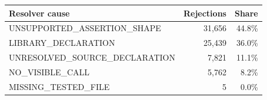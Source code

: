   \renewcommand{\theHreporttablerow}{rq6_missing_value_causes.\arabic{reporttablerow}}
  \setcounter{reporttablerow}{0}
  \begin{tabular}{lrr}
  \toprule
  Resolver cause & Rejections & Share \\
  \midrule
  {reporttablerow}\label{tabrow:rq6_missing_value_causes:UNSUPPORTED_ASSERTION_SHAPE}UNSUPPORTED\_ASSERTION\_SHAPE & 31,656 & 44.8\% \\
  {reporttablerow}\label{tabrow:rq6_missing_value_causes:LIBRARY_DECLARATION}LIBRARY\_DECLARATION & 25,439 & 36.0\% \\
  {reporttablerow}\label{tabrow:rq6_missing_value_causes:UNRESOLVED_SOURCE_DECLARATION}UNRESOLVED\_SOURCE\_DECLARATION & 7,821 & 11.1\% \\
  {reporttablerow}\label{tabrow:rq6_missing_value_causes:NO_VISIBLE_CALL}NO\_VISIBLE\_CALL & 5,762 & 8.2\% \\
  {reporttablerow}\label{tabrow:rq6_missing_value_causes:MISSING_TESTED_FILE}MISSING\_TESTED\_FILE & 5 & 0.0\% \\
  \bottomrule
  \end{tabular}
